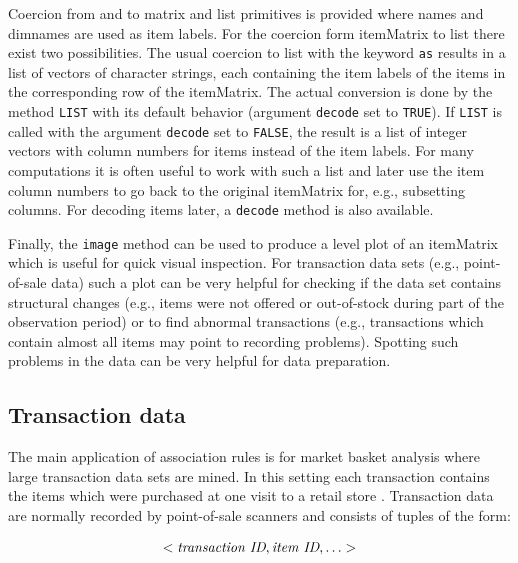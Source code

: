 \documentclass[10pt,a4paper]{article}
\newcommand{\class}[1]{\textsf{#1}}
\newcommand{\code}[1]{\texttt{#1}}
\begin{document}
Coercion from and to \class{matrix} and
\class{list} primitives is provided where names and dimnames are
used as item labels. 
For the coercion form \class{itemMatrix} to \class{list} there 
exist two possibilities.
The usual coercion to \class{list} with the keyword \code{as} results in a
list of vectors of character strings, each containing the item labels of the
items in the corresponding row of the \class{itemMatrix}. The actual
conversion is done by the method \code{LIST} with its default behavior
(argument \code{decode} set to \code{TRUE}).
If \code{LIST} is called with the argument \code{decode} set to \code{FALSE},
the result is a list of integer vectors with column numbers 
for items instead of the
item labels. For many computations it is often useful to work with 
such a list and later use the item column numbers to go back to the 
original \class{itemMatrix} for,
e.g., subsetting columns.
For decoding items later, a \code{decode} method is also available.


Finally, the \code{image} method can be used to produce a
level plot of an \class{itemMatrix} which is useful for quick 
visual inspection.  
For transaction data sets (e.g., point-of-sale data) such a plot can be very
helpful for checking if the data set contains structural changes (e.g.,
items were not offered or out-of-stock during part of the observation
period) or to find abnormal transactions (e.g., transactions which
contain almost all items may point to recording problems).
Spotting such problems in the data can be very helpful for data preparation.




\subsection{Transaction data\label{sec:transactions}}

The main application of association rules is for market basket analysis
where large transaction data sets are mined.  In this setting each
transaction contains the items which were purchased at one visit to a
retail store \citep[see e.g.,][]{arules:Berry+Linoff:1997}.
Transaction data are normally recorded by point-of-sale
scanners and consists of tuples of the form:

\begin{displaymath}
<\emph{transaction ID}, \emph{item ID}, \ldots >
\end{displaymath}
\end{document}
